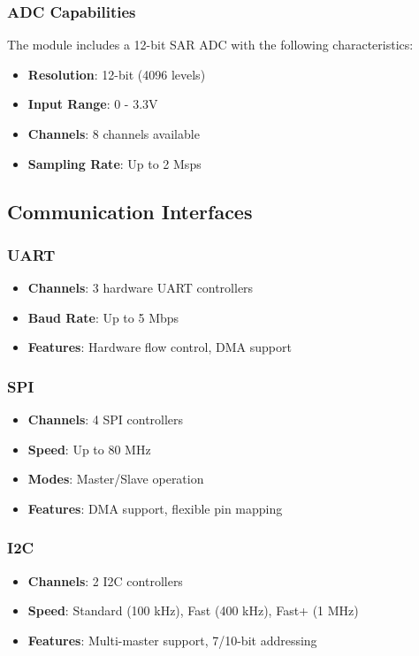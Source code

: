 \documentclass[11pt,a4paper]{article}
\begin{document}
\subsubsection{ADC Capabilities}

The module includes a 12-bit SAR ADC with the following characteristics:

\begin{itemize}
\item \textbf{Resolution}: 12-bit (4096 levels)
\item \textbf{Input Range}: 0 - 3.3V
\item \textbf{Channels}: 8 channels available
\item \textbf{Sampling Rate}: Up to 2 Msps
\end{itemize}

\subsection{Communication Interfaces}

\subsubsection{UART}
\begin{itemize}
\item \textbf{Channels}: 3 hardware UART controllers
\item \textbf{Baud Rate}: Up to 5 Mbps
\item \textbf{Features}: Hardware flow control, DMA support
\end{itemize}

\subsubsection{SPI}
\begin{itemize}
\item \textbf{Channels}: 4 SPI controllers
\item \textbf{Speed}: Up to 80 MHz
\item \textbf{Modes}: Master/Slave operation
\item \textbf{Features}: DMA support, flexible pin mapping
\end{itemize}

\subsubsection{I2C}
\begin{itemize}
\item \textbf{Channels}: 2 I2C controllers
\item \textbf{Speed}: Standard (100 kHz), Fast (400 kHz), Fast+ (1 MHz)
\item \textbf{Features}: Multi-master support, 7/10-bit addressing
\end{itemize}
\end{document}
